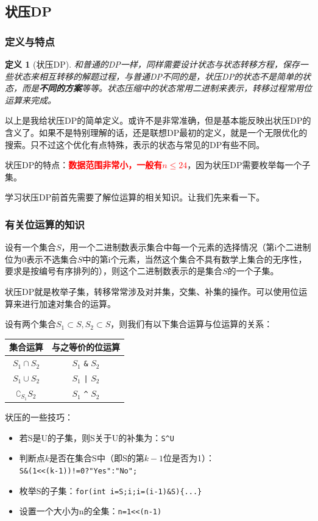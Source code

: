 \documentclass{article}
\newtheorem{definition}{定义}[subsection]
\theoremstyle{nonumberplain}
\begin{document}
\subsection{状压DP}
\subsubsection{定义与特点}
\begin{definition}[状压DP]和普通的DP一样，同样需要设计状态与状态转移方程，保存一些状态来相互转移的解题过程，与普通DP不同的是，状压DP的状态不是简单的状态，而是\textbf{不同的方案}等等。状态压缩中的状态常用二进制来表示，转移过程常用位运算来完成。
\end{definition}

以上是我给状压DP的简单定义。或许不是非常准确，但是基本能反映出状压DP的含义了。如果不是特别理解的话，还是联想DP最初的定义，就是一个无限优化的搜索。只不过这个优化有点特殊，表示的状态与常见的DP有些不同。

状压DP的特点：\textcolor{red}{\textbf{数据范围非常小，一般有$n\leq 24$}}，因为状压DP需要枚举每一个子集。

学习状压DP前首先需要了解位运算的相关知识。让我们先来看一下。
\subsubsection{有关位运算的知识}
设有一个集合$S$，用一个二进制数表示集合中每一个元素的选择情况（第i个二进制位为0表示不选集合$S$中的第i个元素，当然这个集合不具有数学上集合的无序性，要求是按编号有序排列的），则这个二进制数表示的是集合$S$的一个子集。

状压DP就是枚举子集，转移常常涉及对并集，交集、补集的操作。可以使用位运算来进行加速对集合的运算。

设有两个集合$S_1\subset S, S_2\subset S$，则我们有以下集合运算与位运算的关系：

\begin{center}
	\begin{tabular}{|c|c|}
		\hline
		集合运算               & 与之等价的位运算                   \\
		\hline
		$S_1\cap S_2$          & $S_1$ \verb+&+ $S_2$ \\
		\hline
		$S_1\cup S_2$          & $S_1$ \verb+|+ $S_2$ \\
		\hline
		$\complement_{S_1}S_2$ & $S_1$ \verb+^+ $S_2$ \\
		\hline
	\end{tabular}
\end{center}

状压的一些技巧：
\begin{itemize}
	\item{若S是U的子集，则S关于U的补集为：\verb$S^U$}
	\item{判断点$k$是否在集合S中（即S的第$k- 1$位是否为1）：\\\verb$S&(1<<(k-1))!=0?"Yes":"No";$}
	\item{枚举S的子集：\verb$for(int i=S;i;i=(i-1)&S){...}$}
	\item{设置一个大小为n的全集：\verb$n=1<<(n-1)$}
\end{itemize}
\end{document}
